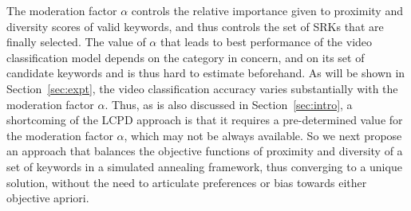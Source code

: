 The moderation factor $\alpha$ controls the relative importance given to proximity and diversity scores of valid keywords, and thus controls the set of SRKs that are finally selected. The value of $\alpha$ that leads to best performance of the video classification model depends on the category in concern, and on its set of candidate keywords and is thus hard to estimate beforehand. As will be shown in Section~\ref{sec:expt}, the video classification accuracy varies substantially with the moderation factor $\alpha$. Thus, as is also discussed in Section~\ref{sec:intro}, a shortcoming of the LCPD approach is that it requires a pre-determined value for the moderation factor $\alpha$, which may not be always available. So we next propose an approach that balances the objective functions of proximity and diversity of a set of keywords in a simulated annealing framework, thus converging to a unique solution, without the need to articulate preferences or bias towards either objective apriori.  